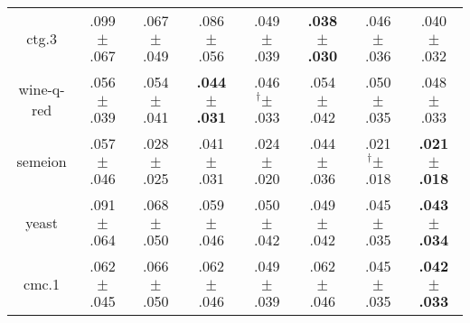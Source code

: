 \begin{tabular}{|c|ccccccc|}
ctg.3 & .099$^{\phantom{\dag}}\pm^{\phantom{\dag}}$.067\cellcolor{red!40} & .067$^{\phantom{\dag}}\pm^{\phantom{\dag}}$.049\cellcolor{green!2} & .086$^{\phantom{\dag}}\pm^{\phantom{\dag}}$.056\cellcolor{red!22} & .049$^{\phantom{\dag}}\pm^{\phantom{\dag}}$.039\cellcolor{green!26} & \textbf{.038$^{\phantom{\dag}}\pm^{\phantom{\dag}}$.030}\cellcolor{green!40} & .046$^{\phantom{\dag}}\pm^{\phantom{\dag}}$.036\cellcolor{green!30} & .040$^{\phantom{\dag}}\pm^{\phantom{\dag}}$.032\cellcolor{green!37} \\
wine-q-red & .056$^{\phantom{\dag}}\pm^{\phantom{\dag}}$.039\cellcolor{red!40} & .054$^{\phantom{\dag}}\pm^{\phantom{\dag}}$.041\cellcolor{red!29} & \textbf{.044$^{\phantom{\dag}}\pm^{\phantom{\dag}}$.031}\cellcolor{green!40} & .046$^{\dag}\pm^{\phantom{\dag}}$.033\cellcolor{green!28} & .054$^{\phantom{\dag}}\pm^{\phantom{\dag}}$.042\cellcolor{red!25} & .050$^{\phantom{\dag}}\pm^{\phantom{\dag}}$.035\cellcolor{red!0} & .048$^{\phantom{\dag}}\pm^{\phantom{\dag}}$.033\cellcolor{green!15} \\
semeion & .057$^{\phantom{\dag}}\pm^{\phantom{\dag}}$.046\cellcolor{red!40} & .028$^{\phantom{\dag}}\pm^{\phantom{\dag}}$.025\cellcolor{green!25} & .041$^{\phantom{\dag}}\pm^{\phantom{\dag}}$.031\cellcolor{red!3} & .024$^{\phantom{\dag}}\pm^{\phantom{\dag}}$.020\cellcolor{green!33} & .044$^{\phantom{\dag}}\pm^{\phantom{\dag}}$.036\cellcolor{red!9} & .021$^{\dag}\pm^{\phantom{\dag}}$.018\cellcolor{green!39} & \textbf{.021$^{\phantom{\dag}}\pm^{\phantom{\dag}}$.018}\cellcolor{green!40} \\
yeast & .091$^{\phantom{\dag}}\pm^{\phantom{\dag}}$.064\cellcolor{red!40} & .068$^{\phantom{\dag}}\pm^{\phantom{\dag}}$.050\cellcolor{red!0} & .059$^{\phantom{\dag}}\pm^{\phantom{\dag}}$.046\cellcolor{green!13} & .050$^{\phantom{\dag}}\pm^{\phantom{\dag}}$.042\cellcolor{green!29} & .049$^{\phantom{\dag}}\pm^{\phantom{\dag}}$.042\cellcolor{green!29} & .045$^{\phantom{\dag}}\pm^{\phantom{\dag}}$.035\cellcolor{green!37} & \textbf{.043$^{\phantom{\dag}}\pm^{\phantom{\dag}}$.034}\cellcolor{green!40} \\
cmc.1 & .062$^{\phantom{\dag}}\pm^{\phantom{\dag}}$.045\cellcolor{red!26} & .066$^{\phantom{\dag}}\pm^{\phantom{\dag}}$.050\cellcolor{red!40} & .062$^{\phantom{\dag}}\pm^{\phantom{\dag}}$.046\cellcolor{red!28} & .049$^{\phantom{\dag}}\pm^{\phantom{\dag}}$.039\cellcolor{green!18} & .062$^{\phantom{\dag}}\pm^{\phantom{\dag}}$.046\cellcolor{red!26} & .045$^{\phantom{\dag}}\pm^{\phantom{\dag}}$.035\cellcolor{green!31} & \textbf{.042$^{\phantom{\dag}}\pm^{\phantom{\dag}}$.033}\cellcolor{green!40} \\

\end{tabular}
